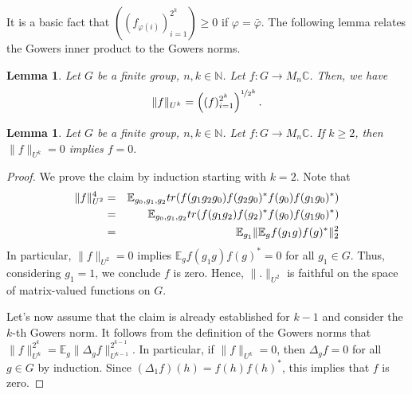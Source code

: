 \documentclass[a4paper,11pt]{amsproc}
\theoremstyle{plain}
\newtheorem{lemma}[theorem]{Lemma}
\theoremstyle{definition}
\begin{document}
It is a basic fact that $((f_{\varphi(i)})_{i=1}^{2^k}) \geq 0$ if $\varphi = \bar \varphi$. The following lemma relates the Gowers inner product to the Gowers norms.

\begin{lemma} Let $G$ be a finite group, $n,k \in \mathbb N$. Let $f \colon G \to M_n \mathbb C$. Then, we have
$$\|f\|_{U^k} = \left((f)_{i=1}^{2^k}\right)^{\nicefrac1{2^k}}.$$
\end{lemma}

\begin{lemma} \label{lem:gowfaith}
Let $G$ be a finite group, $n,k \in \mathbb N$. Let $f \colon G \to M_n \mathbb C$. If $k \geq 2$, then
$\|f\|_{U^k}=0$ implies $f=0.$
\end{lemma}
\begin{proof}
We prove the claim by induction starting with $k=2$. Note that 
\begin{eqnarray*}
\|f\|^4_{U^2} &=& \mathbb E_{g_0,g_1,g_2} {\rm tr}(f(g_1g_2g_0)f(g_2g_0)^* f(g_0)f(g_1g_0)^* )\\
&=& \mathbb E_{g_0,g_1,g_2} {\rm tr}(f(g_1g_2)f(g_2)^* f(g_0)f(g_1g_0)^* )\\
&=& \mathbb E_{g_1}   \|\mathbb E_{g} f(g_1g)f(g)^*\|^2_{2} 
\end{eqnarray*}
In particular, $\|f\|_{U^2}=0$ implies $\mathbb E_{g} f(g_1g)f(g)^*=0$ for all $g_1 \in G$. Thus, considering $g_1=1$, we conclude $f$ is zero. Hence, $\|.\|_{U^2}$ is faithful on the space of matrix-valued functions on $G$. 

Let's now assume that the claim is already established for $k-1$ and consider the $k$-th Gowers norm. It follows from the definition of the Gowers norms that
$\|f\|^{2^k}_{U^k} = \mathbb E_g \|\Delta_g f\|^{2^{k-1}}_{U^{k-1}}.$ In particular, if $\|f\|_{U^k}=0$, then $\Delta_g f =0$ for all $g \in G$ by induction. Since $(\Delta_1 f)(h) = f(h)f(h)^*$, this implies that $f$ is zero.
\end{proof}
\end{document}
